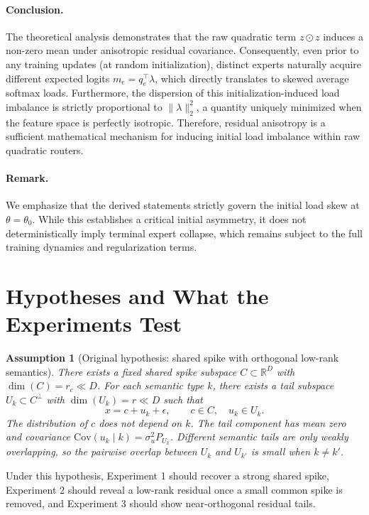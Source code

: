 \documentclass[11pt]{article}
\newtheorem{assumption}{Assumption}
\begin{document}
\paragraph{Conclusion.}
The theoretical analysis demonstrates that the raw quadratic term $z\odot z$ induces a non-zero mean under anisotropic residual covariance. Consequently, even prior to any training updates (at random initialization), distinct experts naturally acquire different expected logits $m_e=q_e^\top\lambda$, which directly translates to skewed average softmax loads.
Furthermore, the dispersion of this initialization-induced load imbalance is strictly proportional to $\|\lambda\|_2^2$, a quantity uniquely minimized when the feature space is perfectly isotropic. Therefore, residual anisotropy is a sufficient mathematical mechanism for inducing initial load imbalance within raw quadratic routers.

\paragraph{Remark.}
We emphasize that the derived statements strictly govern the initial load skew at $\theta = \theta_0$. While this establishes a critical initial asymmetry, it does not deterministically imply terminal expert collapse, which remains subject to the full training dynamics and regularization terms.

\section{Hypotheses and What the Experiments Test}

\begin{assumption}[Original hypothesis: shared spike with orthogonal low-rank semantics]
There exists a fixed shared spike subspace $C \subset \mathbb{R}^D$ with $\dim(C)=r_c \ll D$. For each semantic type $k$, there exists a tail subspace $U_k \subset C^\perp$ with $\dim(U_k)=r \ll D$ such that
\[
x = c + u_k + \epsilon, \qquad c \in C, \quad u_k \in U_k.
\]
The distribution of $c$ does not depend on $k$. The tail component has mean zero and covariance $\mathrm{Cov}(u_k \mid k)=\sigma_u^2 P_{U_k}$. Different semantic tails are only weakly overlapping, so the pairwise overlap between $U_k$ and $U_{k'}$ is small when $k \neq k'$.
\end{assumption}

Under this hypothesis, Experiment 1 should recover a strong shared spike, Experiment 2 should reveal a low-rank residual once a small common spike is removed, and Experiment 3 should show near-orthogonal residual tails.
\end{document}
